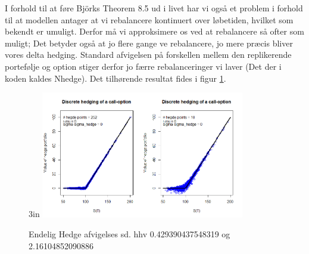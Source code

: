 \documentclass{article}
\theoremstyle{definition}
\theoremstyle{remark}
\begin{document}
I forhold til at føre Björks Theorem 8.5 ud i livet har vi også et problem i forhold til at modellen antager at vi rebalancere kontinuert over løbetiden, hvilket som bekendt er umuligt. Derfor må vi approksimere os ved at rebalancere så ofter som muligt; Det betyder også at jo flere gange ve rebalancere, jo mere præcis bliver vores delta hedging. Standard afvigelsen på forskellen mellem den replikerende portefølje og option stiger derfor jo færre rebalanceringer vi laver (Det der i koden kaldes Nhedge). Det tilhørende resultat fides i figur \ref{fig:my_label6}.
\begin{figure}{3in}
    \centering
    \includegraphics[width=3.5in]{Rplot26.png}
    \caption{Endelig Hedge afvigelses sd. hhv 0.429390437548319 og 2.16104852090886}
    \label{fig:my_label6}
\end{figure}
\end{document}
